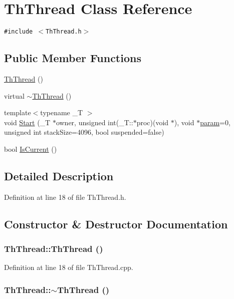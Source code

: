 \hypertarget{class_th_thread}{
\section{ThThread Class Reference}
\label{class_th_thread}
}
{\tt \#include $<$ThThread.h$>$}

\subsection*{Public Member Functions}
\begin{CompactItemize}
\item 
\hyperlink{class_th_thread_52067055c1ff746477020186f26435a1}{ThThread} ()
\item 
virtual \hyperlink{class_th_thread_2064ba5d51149a39e97d53adc3960ca5}{$\sim$ThThread} ()
\item 
{\footnotesize template$<$typename \_\-T $>$ }\\void \hyperlink{class_th_thread_04873bccc79605fc5c35da85464e7191}{Start} (\_\-T $\ast$owner, unsigned int(\_\-T::$\ast$proc)(void $\ast$), void $\ast$\hyperlink{glext__bak_8h_c7c896d55e93a6cf7ff8524005b4e7b4}{param}=0, unsigned int stackSize=4096, bool suspended=false)
\item 
bool \hyperlink{class_th_thread_fe2840d32112d45a88175e81dc6d6e68}{IsCurrent} ()
\end{CompactItemize}


\subsection{Detailed Description}


Definition at line 18 of file ThThread.h.

\subsection{Constructor \& Destructor Documentation}
\hypertarget{class_th_thread_52067055c1ff746477020186f26435a1}{
\subsubsection[{ThThread}]{\setlength{\rightskip}{0pt plus 5cm}ThThread::ThThread ()}}
\label{class_th_thread_52067055c1ff746477020186f26435a1}




Definition at line 18 of file ThThread.cpp.\hypertarget{class_th_thread_2064ba5d51149a39e97d53adc3960ca5}{
\subsubsection[{$\sim$ThThread}]{\setlength{\rightskip}{0pt plus 5cm}ThThread::$\sim$ThThread ()}}
\label{class_th_thread_2064ba5d51149a39e97d53adc3960ca5}




